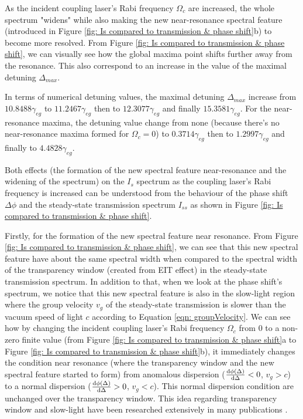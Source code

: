 As the incident coupling laser's Rabi frequency $\Omega_{c}$ are increased, the whole spectrum "widens" while also making the new near-resonance spectral feature (introduced in Figure \ref{fig: Is compared to transmission & phase shift}b) to become more resolved. From Figure \ref{fig: Is compared to transmission & phase shift}, we can visually see how the global maxima point shifts further away from the resonance. This also correspond to an increase in the value of the maximal detuning $\Delta_{max}$.

In terms of numerical detuning values, the maximal detuning $\Delta_{max}$ increase from $10.8488\gamma_{eg}$ to $11.2467\gamma_{eg}$ then to $12.3077\gamma_{eg}$ and finally $15.3581\gamma_{eg}$. For the near-resonance maxima, the detuning value change from none (because there's no near-resonance maxima formed for $\Omega_{c} = 0$) to $0.3714\gamma_{eg}$ then to $1.2997\gamma_{eg}$ and finally to $4.4828\gamma_{eg}$.

Both effects (the formation of the new spectral feature near-resonance and the widening of the spectrum) on the $I_{s}$ spectrum as the coupling laser's Rabi frequency is increased  can be understood from the behaviour of the phase shift $\Delta\phi$ and the steady-state transmission spectrum $I_{ss}$ as shown in Figure \ref{fig: Is compared to transmission & phase shift}.

Firstly, for the formation of the new spectral feature near resonance. From Figure \ref{fig: Is compared to transmission & phase shift}, we can see that this new spectral feature have about the same spectral width when compared to the spectral width of the transparency window (created from EIT effect) in the steady-state transmission spectrum. In addition to that, when we look at the phase shift's spectrum, we notice that this new spectral feature is also in the slow-light region where the group velocity $v_{g}$ of the steady-state transmission is slower than the vacuum speed of light $c$ according to Equation \ref{eqn: groupVelocity}. We can see how by changing the incident coupling laser's Rabi frequency $\Omega_{c}$ from $0$ to a non-zero finite value (from Figure \ref{fig: Is compared to transmission & phase shift}a to Figure \ref{fig: Is compared to transmission & phase shift}b), it immediately changes the condition near resonance (where the transparency window and the new spectral feature started to form) from anomalous dispersion ($\dv{\phi(\Delta)}{\Delta} < 0$, $v_{g} > c$) to a normal dispersion ($\dv{\phi(\Delta)}{\Delta} > 0$, $v_{g} < c$). This normal dispersion condition are unchanged over the transparency window. This idea regarding transparency window and slow-light have been researched extensively in many publications \cite{jeong2010slow, MacKe2009, Jeong2009, MacKe2009, Braje2004}.

